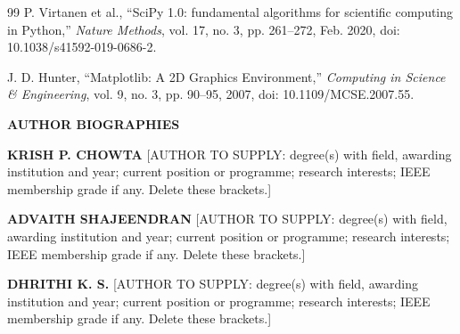 \documentclass[10pt,twocolumn]{article}
\begin{document}
{\begin{thebibliography}{99}
P. Virtanen et al., ``SciPy 1.0: fundamental algorithms for scientific computing in Python,'' \emph{Nature Methods}, vol. 17, no. 3, pp. 261--272, Feb. 2020, doi: 10.1038/s41592-019-0686-2.

J. D. Hunter, ``Matplotlib: A 2D Graphics Environment,'' \emph{Computing in Science \& Engineering}, vol. 9, no. 3, pp. 90--95, 2007, doi: 10.1109/MCSE.2007.55.

\end{thebibliography}
}

\vspace{10pt}
{\helv\fontsize{9}{11}\bfseries\color{accessblue}\MakeTextUppercase{Author Biographies}\par}
\vspace{4pt}
{\fontsize{8}{9.5}\selectfont

\noindent\begin{minipage}[t]{1.0in}\vspace{0pt}%
\end{minipage}\hfill
\begin{minipage}[t]{\dimexpr\columnwidth-1.1in\relax}\vspace{0pt}%
\textbf{KRISH P. CHOWTA} [AUTHOR TO SUPPLY: degree(s) with field, awarding institution and year; current position or programme; research interests; IEEE membership grade if any. Delete these brackets.]
\end{minipage}

\vspace{8pt}
\noindent\begin{minipage}[t]{1.0in}\vspace{0pt}%
\end{minipage}\hfill
\begin{minipage}[t]{\dimexpr\columnwidth-1.1in\relax}\vspace{0pt}%
\textbf{ADVAITH SHAJEENDRAN} [AUTHOR TO SUPPLY: degree(s) with field, awarding institution and year; current position or programme; research interests; IEEE membership grade if any. Delete these brackets.]
\end{minipage}

\vspace{8pt}
\noindent\begin{minipage}[t]{1.0in}\vspace{0pt}%
\end{minipage}\hfill
\begin{minipage}[t]{\dimexpr\columnwidth-1.1in\relax}\vspace{0pt}%
\textbf{DHRITHI K. S.} [AUTHOR TO SUPPLY: degree(s) with field, awarding institution and year; current position or programme; research interests; IEEE membership grade if any. Delete these brackets.]
\end{minipage}

}
\end{document}
